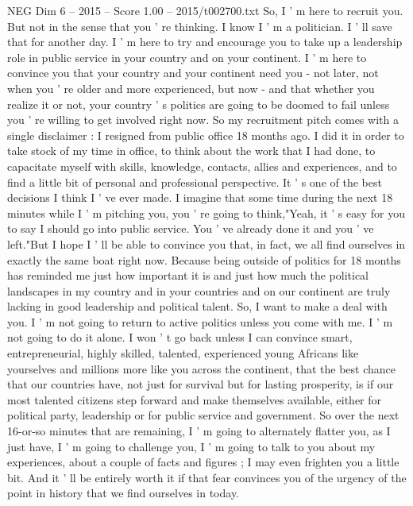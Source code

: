 \begin{textsample}{NEG Dim 6 – 2015 – Score 1.00 – 2015/t002700.txt}  \label{ex:f6_neg_027}
So, I ' m here to recruit you.
But not in the sense that you ' re thinking.
I know I ' m a politician.
I ' ll save that for another day.
I ' m here to try and encourage you to take up a leadership role in public service in your country and on your continent.
I ' m here to convince you that your country and your continent need you - not later, not when you ' re older and more experienced, but now - and that whether you realize it or not, your country ' s politics are going to be doomed to fail unless you ' re willing to get involved right now.
So my recruitment pitch comes with a single disclaimer : I resigned from public office 18 months ago.
I did it in order to take stock of my time in office, to think about the work that I had done, to capacitate myself with skills, knowledge, contacts, allies and experiences, and to find a little bit of personal and professional perspective.
It ' s one of the best decisions I think I ' ve ever made.
I imagine that some time during the next 18 minutes while I ' m pitching you, you ' re going to think,"Yeah, it ' s easy for you to say I should go into public service.
You ' ve already done it and you ' ve left."But I hope I ' ll be able to convince you that, in fact, we all find ourselves in exactly the same boat right now.
Because being outside of politics for 18 months has reminded me just how important it is and just how much the political landscapes in my country and in your countries and on our continent are truly lacking in good leadership and political talent.
So, I want to make a deal with you.
I ' m not going to return to active politics unless you come with me.
I ' m not going to do it alone.
I won ' t go back unless I can convince smart, entrepreneurial, highly skilled, talented, experienced young Africans like yourselves and millions more like you across the continent, that the best chance that our countries have, not just for survival but for lasting prosperity, is if our most talented citizens step forward and make themselves available, either for political party, leadership or for public service and government.
So over the next 16-or-so minutes that are remaining, I ' m going to alternately flatter you, as I just have, I ' m going to challenge you, I ' m going to talk to you about my experiences, about a couple of facts and figures ; I may even frighten you a little bit.
And it ' ll be entirely worth it if that fear convinces you of the urgency of the point in history that we find ourselves in today.

\end{textsample}

